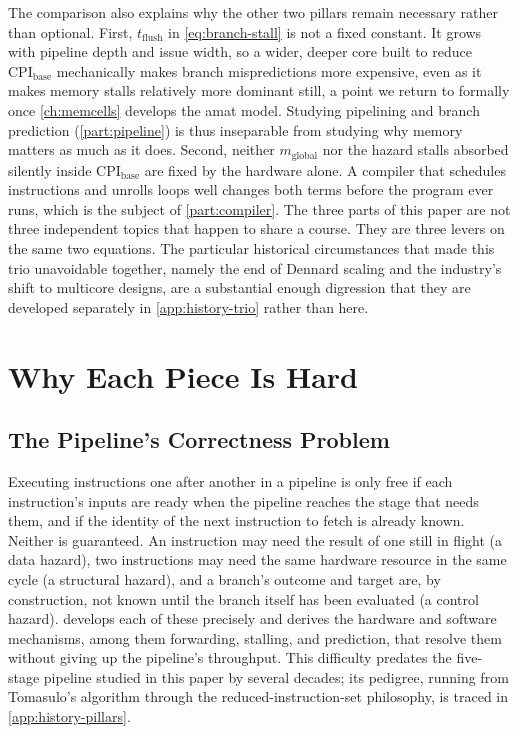 \documentclass[12pt,a4paper]{report}
\begin{document}
The comparison also explains why the other two pillars remain necessary
rather than optional. First, $t_{\text{flush}}$ in \cref{eq:branch-stall}
is not a fixed constant. It grows with pipeline depth and issue width,
so a wider, deeper core built to reduce $\text{CPI}_{\text{base}}$
mechanically makes branch mispredictions more expensive, even as it
makes memory stalls relatively more dominant still, a point we return to
formally once \cref{ch:memcells} develops the \gls{amat} model. Studying
pipelining and branch prediction (\cref{part:pipeline}) is thus
inseparable from studying why memory matters as much as it does. Second,
neither $m_{\text{global}}$ nor the hazard stalls absorbed silently
inside $\text{CPI}_{\text{base}}$ are fixed by the hardware alone. A
compiler that schedules instructions and unrolls loops well changes both
terms before the program ever runs, which is the subject of
\cref{part:compiler}. The three parts of this paper are not three
independent topics that happen to share a course. They are three levers
on the same two equations. The particular historical circumstances that
made this trio unavoidable together, namely the end of Dennard scaling
and the industry's shift to multicore designs, are a substantial enough
digression that they are developed separately in
\cref{app:history-trio} rather than here.

\section{Why Each Piece Is Hard}
\label{sec:why-hard}

\subsection{The Pipeline's Correctness Problem}
Executing instructions one after another in a pipeline is only free if
each instruction's inputs are ready when the pipeline reaches the stage
that needs them, and if the identity of the next instruction to fetch is
already known. Neither is guaranteed. An instruction may need the result
of one still in flight (a data hazard), two instructions may need the
same hardware resource in the same cycle (a structural hazard), and a
branch's outcome and target are, by construction, not known until the
branch itself has been evaluated (a control hazard).
 develops each of these precisely and derives
the hardware and software mechanisms, among them forwarding, stalling,
and prediction, that resolve them without giving up the pipeline's
throughput. This difficulty predates the five-stage pipeline studied in
this paper by several decades; its pedigree, running from Tomasulo's
algorithm through the reduced-instruction-set philosophy, is traced in
\cref{app:history-pillars}.
\end{document}
